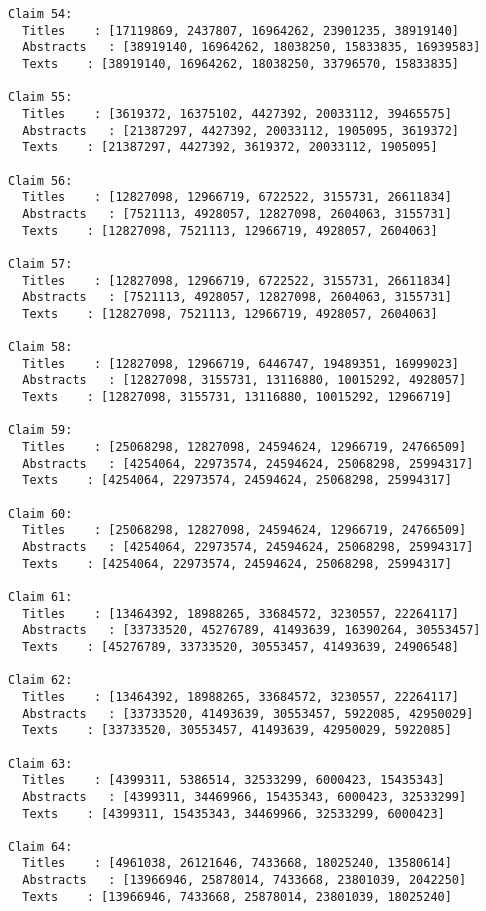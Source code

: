 \documentclass[11pt]{article}
\begin{document}
\begin{Verbatim}[commandchars=\\\{\}]
Claim 54:
  Titles    : [17119869, 2437807, 16964262, 23901235, 38919140]
  Abstracts   : [38919140, 16964262, 18038250, 15833835, 16939583]
  Texts    : [38919140, 16964262, 18038250, 33796570, 15833835]

Claim 55:
  Titles    : [3619372, 16375102, 4427392, 20033112, 39465575]
  Abstracts   : [21387297, 4427392, 20033112, 1905095, 3619372]
  Texts    : [21387297, 4427392, 3619372, 20033112, 1905095]

Claim 56:
  Titles    : [12827098, 12966719, 6722522, 3155731, 26611834]
  Abstracts   : [7521113, 4928057, 12827098, 2604063, 3155731]
  Texts    : [12827098, 7521113, 12966719, 4928057, 2604063]

Claim 57:
  Titles    : [12827098, 12966719, 6722522, 3155731, 26611834]
  Abstracts   : [7521113, 4928057, 12827098, 2604063, 3155731]
  Texts    : [12827098, 7521113, 12966719, 4928057, 2604063]

Claim 58:
  Titles    : [12827098, 12966719, 6446747, 19489351, 16999023]
  Abstracts   : [12827098, 3155731, 13116880, 10015292, 4928057]
  Texts    : [12827098, 3155731, 13116880, 10015292, 12966719]

Claim 59:
  Titles    : [25068298, 12827098, 24594624, 12966719, 24766509]
  Abstracts   : [4254064, 22973574, 24594624, 25068298, 25994317]
  Texts    : [4254064, 22973574, 24594624, 25068298, 25994317]

Claim 60:
  Titles    : [25068298, 12827098, 24594624, 12966719, 24766509]
  Abstracts   : [4254064, 22973574, 24594624, 25068298, 25994317]
  Texts    : [4254064, 22973574, 24594624, 25068298, 25994317]

Claim 61:
  Titles    : [13464392, 18988265, 33684572, 3230557, 22264117]
  Abstracts   : [33733520, 45276789, 41493639, 16390264, 30553457]
  Texts    : [45276789, 33733520, 30553457, 41493639, 24906548]

Claim 62:
  Titles    : [13464392, 18988265, 33684572, 3230557, 22264117]
  Abstracts   : [33733520, 41493639, 30553457, 5922085, 42950029]
  Texts    : [33733520, 30553457, 41493639, 42950029, 5922085]

Claim 63:
  Titles    : [4399311, 5386514, 32533299, 6000423, 15435343]
  Abstracts   : [4399311, 34469966, 15435343, 6000423, 32533299]
  Texts    : [4399311, 15435343, 34469966, 32533299, 6000423]

Claim 64:
  Titles    : [4961038, 26121646, 7433668, 18025240, 13580614]
  Abstracts   : [13966946, 25878014, 7433668, 23801039, 2042250]
  Texts    : [13966946, 7433668, 25878014, 23801039, 18025240]


\end{Verbatim}
\end{document}
